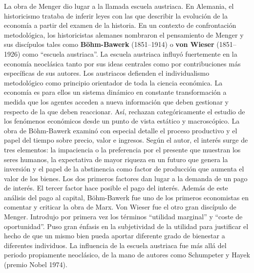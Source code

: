 \documentclass{nuevotema}
\begin{document}
La obra de Menger dio lugar a la llamada escuela austriaca. En Alemania, el historicismo trataba de inferir leyes con las que describir la evolución de la economía a partir del examen de la historia. En un contexto de confrontación metodológica, los historicistas alemanes nombraron el pensamiento de Menger y sus discípulos tales como \textbf{Böhm-Bawerk} (1851--1914) o \textbf{von Wieser} (1851--1926) como ``escuela austriaca''. La escuela austriaca influyó fuertemente en la economía neoclásica tanto por sus ideas centrales como por contribuciones más específicas de sus autores. Los austriacos defienden el individualismo metodológico como principio orientador de toda la ciencia económica. La economía es para ellos un sistema dinámico en constante transformación a medida que los agentes acceden a nueva información que deben gestionar y respecto de la que deben reaccionar. Así, rechazan categóricamente el estudio de los fenómenos económicos desde un punto de vista estático y macroscópico. La obra de Böhm-Bawerk examinó con especial detalle el proceso productivo y el papel del tiempo sobre precio, valor e ingresos. Según el autor, el interés surge de tres elementos: la impaciencia o la preferencia por el presente que muestran los seres humanos, la expectativa de mayor riqueza en un futuro que genera la inversión y el papel de la abstinencia como factor de producción que aumenta el valor de los bienes. Los dos primeros factores dan lugar a la demanda de un pago de interés. El tercer factor hace posible el pago del interés. Además de este análisis del pago al capital, Böhm-Bawerk fue uno de los primeros economistas en comentar y criticar la obra de Marx. Von Wieser fue el otro gran discípulo de Menger. Introdujo por primera vez los términos ``utilidad marginal'' y ``coste de oportunidad''. Puso gran énfasis en la subjetividad de la utilidad para justificar el hecho de que un mismo bien pueda aportar diferente grado de bienestar a diferentes individuos. La influencia de la escuela austriaca fue más allá del periodo propiamente neoclásico, de la mano de autores como Schumpeter y Hayek (premio Nobel 1974).
\end{document}
